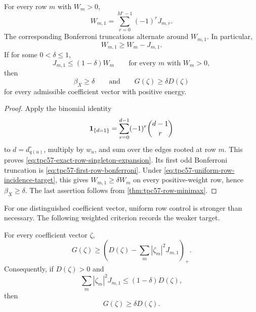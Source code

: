 \begin{proposition}
\label{prop:tpc57-row-collision-hierarchy}
For every row \(m\) with \(W_m>0\),
\begin{equation}
 \boxed{
 W_{m,1}=\sum_{r=0}^{M^\circ-1}(-1)^rJ_{m,r}.}
 \label{eq:tpc57-exact-row-singleton-expansion}
\end{equation}
The corresponding Bonferroni truncations alternate around \(W_{m,1}\).
In particular,
\begin{equation}
 W_{m,1}\ge W_m-J_{m,1}.
 \label{eq:tpc57-first-row-bonferroni}
\end{equation}
If for some \(0<\delta\le1\),
\begin{equation}
 J_{m,1}\le(1-\delta)W_m
 \qquad\text{for every }m\text{ with }W_m>0,
 \label{eq:tpc57-uniform-row-incidence-target}
\end{equation}
then
\begin{equation}
 \beta_X\ge\delta
 \qquad\text{and}\qquad
 G(\zeta)\ge\delta D(\zeta)
 \label{eq:tpc57-uniform-row-incidence-conclusion}
\end{equation}
for every admissible coefficient vector with positive energy.
\end{proposition}

\begin{proof}
Apply the binomial identity
\[
 \mathbf 1_{\{d=1\}}
 =\sum_{r=0}^{d-1}(-1)^r\binom{d-1}{r}
\]
to \(d=d_{q(u)}^\circ\), multiply by \(w_u\), and sum over the edges
rooted at row \(m\).  This proves
\eqref{eq:tpc57-exact-row-singleton-expansion}.  Its first odd
Bonferroni truncation is \eqref{eq:tpc57-first-row-bonferroni}.  Under
\eqref{eq:tpc57-uniform-row-incidence-target}, this gives
\(W_{m,1}\ge\delta W_m\) on every positive-weight row, hence
\(\beta_X\ge\delta\).  The last assertion follows from
\cref{thm:tpc57-row-minimax}.
\end{proof}

For one distinguished coefficient vector, uniform row control is stronger
than necessary.  The following weighted criterion records the weaker
target.

\begin{corollary}
\label{cor:tpc57-distinguished-row-criterion}
For every coefficient vector \(\zeta\),
\begin{equation}
 G(\zeta)
 \ge
 \left(
 D(\zeta)-\sum_m|\zeta_m|^2J_{m,1}
 \right)_+.
 \label{eq:tpc57-weighted-row-collision-floor}
\end{equation}
Consequently, if \(D(\zeta)>0\) and
\begin{equation}
 \sum_m|\zeta_m|^2J_{m,1}
 \le(1-\delta)D(\zeta),
 \label{eq:tpc57-distinguished-row-incidence-target}
\end{equation}
then
\begin{equation}
 G(\zeta)\ge\delta D(\zeta).
 \label{eq:tpc57-distinguished-row-incidence-conclusion}
\end{equation}
\end{corollary}

